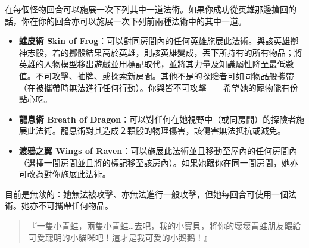 在每個怪物回合可以施展一次下列其中一道法術。如果你成功從英雄那邊搶回的話，你在你的回合亦可以施展一次下列前兩種法術中的其中一道。
\begin{itemize}
  \item \textbf{蛙皮術 Skin of Frog}：可以對同房間內的任何英雄施展此法術。與該英雄擲神志骰，若的擲骰結果高於英雄，則該英雄變成，丟下所持有的所有物品；將英雄的人物模型移出遊戲並用標記取代，並將其力量及知識屬性降至最低數值。不可攻擊、抽牌、或探索新房間。其他不是的探險者可如同物品般攜帶（在被攜帶時無法進行任何行動）。你與皆不可攻擊——希望她的寵物能有份點心吃。
  \item \textbf{龍息術 Breath of Dragon}：可以對任何在她視野中（或同房間）的探險者施展此法術。龍息術對其造成２顆骰的物理傷害，該傷害無法抵抗或減免。
  \item \textbf{渡鴉之翼 Wings of Raven}：可以施展此法術並且移動至屋內的任何房間內（選擇一間房間並且將的標記移至該房內）。如果她跟你在同一間房間，她亦可改為對你施展此法術。
\end{itemize}

目前是無敵的：她無法被攻擊、亦無法進行一般攻擊，但她每回合可使用一個法術。她亦不可攜帶任何物品。

\begin{HauntStory}
  \begin{quote}
    『一隻小青蛙，兩隻小青蛙…去吧，我的小寶貝，將你的壞壞青蛙朋友餵給可愛聰明的小貓咪吧！這才是我可愛的小鵝鵝！』
  \end{quote}
\end{HauntStory}
